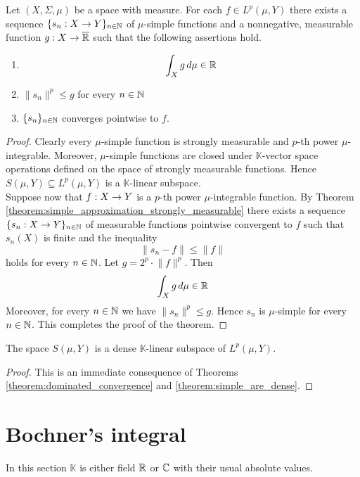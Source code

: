 \begin{theorem}\label{theorem:simple_are_dense}
Let $(X,\Sigma, \mu)$ be a space with measure. For each $f \in L^p(\mu,Y)$ there exists a sequence $\{s_n:X\rightarrow Y\}_{n\in {\mathbb N}}$ of $\mu$-simple functions and a nonnegative, measurable function $g:X\rightarrow \overline{{\mathbb R}}$ such that the following assertions hold.
\begin{enumerate}[label=\emph{\textbf{(\arabic*)}}, leftmargin=*]
\item
$$\int_Xg\,d\mu \in {\mathbb R}$$
\item $\lVert s_n \rVert^p \leq g$ for every $n\in {\mathbb N}$
\item $\{s_n\}_{n\in {\mathbb N}}$ converges pointwise to $f$.
\end{enumerate}
\end{theorem}
\begin{proof}
Clearly every $\mu$-simple function is strongly measurable and $p$-th power $\mu$-integrable. Moreover, $\mu$-simple functions are closed under $\mathbb{K}$-vector space operations defined on the space of strongly measurable functions. Hence $S(\mu, Y) \subseteq L^p(\mu, Y)$ is a $\mathbb{K}$-linear subspace.\\
Suppose now that $f:X\rightarrow Y$ is a $p$-th power $\mu$-integrable function. By Theorem \ref{theorem:simple_approximation_strongly_measurable} there exists a sequence $\{s_n:X\rightarrow Y\}_{n\in {\mathbb N}}$ of measurable functions pointwise convergent to $f$ such that $s_n(X)$ is finite and the inequality
$$\lVert s_n - f\rVert\leq \lVert f\rVert$$
holds for every $n\in {\mathbb N}$. Let $g = 2^p \cdot \lVert f\rVert^p$. Then 
$$\int_Xg\,d\mu \in {\mathbb R}$$
Moreover, for every $n\in {\mathbb N}$ we have $\lVert s_n \rVert^p \leq g$. Hence $s_n$ is $\mu$-simple for every $n\in {\mathbb N}$. This completes the proof of the  theorem.
\end{proof}

\begin{corollary}\label{corollary:simple_are_dense}
The space $S(\mu, Y)$ is a dense $\mathbb{K}$-linear subspace of $L^p(\mu, Y)$.    
\end{corollary}
\begin{proof}
This is an immediate consequence of Theorems \ref{theorem:dominated_convergence} and \ref{theorem:simple_are_dense}.
\end{proof}

\section{Bochner's integral}\label{section:bochner_integration}
\noindent
In this section $\mathbb{K}$ is either field ${\mathbb R}$ or ${\mathbb C}$ with their usual absolute values.

